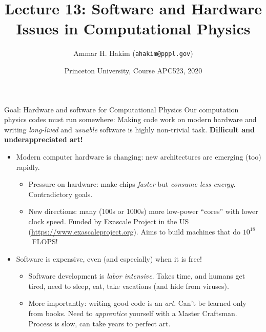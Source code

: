 \documentclass[aspectratio=169]{beamer}
\title[{\tt }] {Lecture 13: Software and Hardware Issues in Computational Physics}%
\author[https://apc523-2020.rtfd.io]%
{Ammar H. Hakim ({\tt ahakim@pppl.gov}) \inst{1}}%
\institute[PPPL]
{ \inst{1} Princeton Plasma Physics Laboratory, Princeton, NJ %
}
\date[3/23/2020]{Princeton University, Course APC523, 2020}
\newcommand{\mypause}{}
\newcommand{\cramplist}{
	\setlength{\itemsep}{0in}
	\setlength{\partopsep}{0in}
	\setlength{\topsep}{0in}}
\begin{document}
\begin{frame}[plain]
  \titlepage
\end{frame}

\begin{frame}{Goal: Hardware and software for Computational Physics}
  Our computation physics codes must run somewhere: Making code work
  on modern hardware and writing \emph{long-lived} and \emph{usuable}
  software is highly non-trivial task. {\bf Difficult
    and underappreciated art!}
  \mypause%
  \begin{itemize}
  \item Modern computer hardware is changing: new architectures are
    emerging (too) rapidly.
    \begin{itemize}\cramplist
    \item Pressure on hardware: make chips \emph{faster} but
      \emph{consume less energy}. Contradictory goals.
    \item New directions: many (100s or 1000s) more low-power
      ``cores'' with lower clock speed. Funded by Exascale Project in
      the US (\url{https://www.exascaleproject.org}). Aims to build
      machines that do $10^{18}$~FLOPS!
    \end{itemize}
      \mypause%
  \item Software is expensive, even (and especially) when it is free!
    \begin{itemize}\cramplist
    \item Software development is \emph{labor intensive}. Takes time,
      and humans get tired, need to sleep, eat, take vacations (and
      hide from viruses).
    \item More importantly: writing good code is an \emph{art}. Can't
      be learned only from books. Need to \emph{apprentice} yourself
      with a Master Craftsman. Process is slow, can take years to
      perfect art.
    \end{itemize}
  \end{itemize}
\end{frame}
\end{document}
